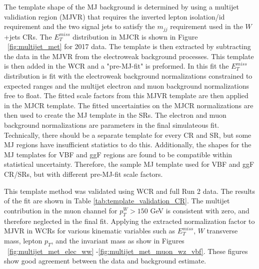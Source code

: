The template shape of the MJ background is determined by using a multijet validiation region (MJVR) that requires the inverted lepton isolation/id requirement and the two signal jets to satisfy the $m_{jj}$ requirement used in the $W$+jets CRs. The $E_{T}^{miss}$ distribution in MJCR is shown in Figure ~\ref{fig:multijet_met} for 2017 data. The template is then extracted by subtracting the data in the MJVR from the electroweak background processes. This template is then added in the WCR and a "pre-MJ-fit" is preformed. In this fit the $E_{T}^{miss}$ distribution is fit with the electroweak background normalizations constrained to expected ranges and the multijet electron and muon background normalizations free to float. The fitted scale factors from this MJVR template are then applied in the MJCR template. The fitted uncertainties on the MJCR normalizations are then used to create the MJ template in the SRs. The electron and muon background normalizations are parameters in the final simulateous fit. Technically, there should be a separate template for every CR and SR, but some MJ regions have insufficient statistics to do this. Additionally, the shapes for the MJ templates for VBF and ggF regions are found to be compatible within statistical uncertainty. Therefore, the sample MJ template used for VBF and ggF CR/SRs, but with different pre-MJ-fit scale factors. 

This template method was validated using WCR and full Run 2 data. The results of the fit are shown in Table \ref{tab:template_validation_CR}. The multijet contribution in the muon channel for $p_{T}^{W} > 150$ GeV is consistent with zero, and therefore neglected in the final fit. Applying the extracted normalization factor to MJVR in WCRs for various kinematic variables such as $E_{T}^{miss}$, $W$ transverse mass, lepton $p_{T}$, and the invariant mass as show in Figures ~\ref{fig:multijet_met_elec_ww} -\ref{fig:multijet_met_muon_wz_vbf}. These figures show good agreement between the data and background estimate.

